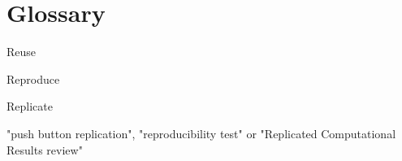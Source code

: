 \section{Glossary}

Reuse

Reproduce

Replicate

"push button replication", "reproducibility test" or "Replicated Computational Results review"